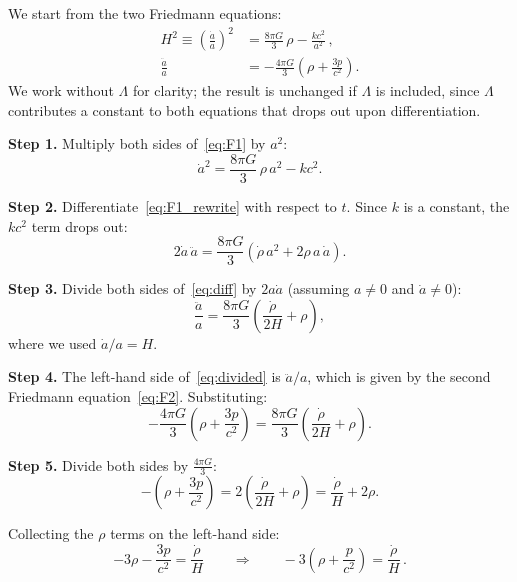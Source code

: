 We start from the two Friedmann equations:
\begin{align}
    H^{2} \equiv \left(\frac{\dot{a}}{a}\right)^{\!2}
    &= \frac{8\pi G}{3}\,\rho - \frac{kc^{2}}{a^{2}}\,,
    \label{eq:F1}\\[6pt]
    \frac{\ddot{a}}{a}
    &= -\frac{4\pi G}{3}\!\left(\rho + \frac{3p}{c^{2}}\right).
    \label{eq:F2}
\end{align}
We work without $\Lambda$ for clarity; the result is unchanged if $\Lambda$ is included, since $\Lambda$ contributes a constant to both equations that drops out upon differentiation.

\medskip
\noindent\textbf{Step 1.} Multiply both sides of~\eqref{eq:F1} by $a^{2}$:
\begin{equation}
    \dot{a}^{2} = \frac{8\pi G}{3}\,\rho\,a^{2} - kc^{2}.
    \label{eq:F1_rewrite}
\end{equation}

\noindent\textbf{Step 2.} Differentiate~\eqref{eq:F1_rewrite} with respect to $t$. Since $k$ is a constant, the $kc^{2}$ term drops out:
\begin{equation}
    2\dot{a}\,\ddot{a}
    = \frac{8\pi G}{3}\!\left(\dot{\rho}\,a^{2} + 2\rho\,a\,\dot{a}\right).
    \label{eq:diff}
\end{equation}

\noindent\textbf{Step 3.} Divide both sides of~\eqref{eq:diff} by $2a\dot{a}$ (assuming $a\neq 0$ and $\dot{a}\neq 0$):
\begin{equation}
    \frac{\ddot{a}}{a}
    = \frac{8\pi G}{3}\!\left(\frac{\dot{\rho}}{2H} + \rho\right),
    \label{eq:divided}
\end{equation}
where we used $\dot{a}/a = H$.

\medskip
\noindent\textbf{Step 4.} The left-hand side of~\eqref{eq:divided} is $\ddot{a}/a$, which is given by the second Friedmann equation~\eqref{eq:F2}. Substituting:
\begin{equation}
    -\frac{4\pi G}{3}\!\left(\rho + \frac{3p}{c^{2}}\right)
    = \frac{8\pi G}{3}\!\left(\frac{\dot{\rho}}{2H} + \rho\right).
\end{equation}

\noindent\textbf{Step 5.} Divide both sides by $\frac{4\pi G}{3}$:
\begin{equation}
    -\left(\rho + \frac{3p}{c^{2}}\right)
    = 2\!\left(\frac{\dot{\rho}}{2H} + \rho\right)
    = \frac{\dot{\rho}}{H} + 2\rho.
\end{equation}

Collecting the $\rho$ terms on the left-hand side:
\begin{equation}
    -3\rho - \frac{3p}{c^{2}} = \frac{\dot{\rho}}{H}
    \qquad\Longrightarrow\qquad
    -3\!\left(\rho + \frac{p}{c^{2}}\right) = \frac{\dot{\rho}}{H}\,.
\end{equation}

